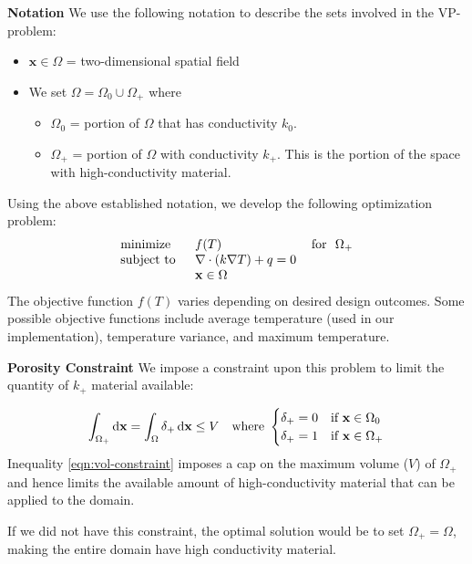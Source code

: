\documentclass[final]{beamer}
\begin{document}
\begin{frame}[t]{\textbf{Notation}}
	We use the following notation to describe the sets involved in the VP-problem:
	\begin{itemize}
		\item $\mathbf{x}\in\Omega$ = two-dimensional spatial field
		\item[] We set $\Omega = \Omega_0\cup\Omega_+$ where
		\begin{itemize}
			\item $\Omega_0$ = portion of $\Omega$ that has conductivity $k_0$.
			\item $\Omega_+$ = portion of $\Omega$ with conductivity $k_+$. This is the portion of the space with high-conductivity material.
		\end{itemize}
	\end{itemize}\vfill\pause
	Using the above established notation, we develop the following optimization problem:
	\begin{equation}
		\begin{tabular}{lll}
			\text{minimize }   & $f(T)$                                                   & \text{for } $\Omega_+$ \\
			\text{subject to } & $\nabla\cdot\left(k\nabla T\right)+q=0$  &                                      \\
			& $\mathbf{x}\in\Omega$ &                                      
		\end{tabular}\label{SIMP-Optimization-Problem}
	\end{equation}\vfill\pause
	The objective function $f(T)$ varies depending on desired design outcomes. Some possible objective functions include average temperature (used in our implementation), temperature variance, and maximum temperature.
\end{frame}

\begin{frame}{\textbf{Porosity Constraint}}
	We impose a constraint upon this problem to limit the quantity of $k_+$ material available:
	
	\begin{equation}
		\int_{\Omega_+}\dif\mathbf{x}=\int_{\Omega}\delta_+\dif\mathbf{x}\leq V\quad\text{where }\begin{cases}\delta_+ = 0 & \text{if }\mathbf{x}\in\Omega_0 \\ \delta_+ = 1 & \text{if }\mathbf{x}\in\Omega_+\end{cases}\label{eqn:vol-constraint}
	\end{equation}\vfill\pause
	Inequality \eqref{eqn:vol-constraint} imposes a cap on the maximum volume ($V$) of $\Omega_+$ and hence limits the available amount of high-conductivity material that can be applied to the domain.\vfill
	
	If we did not have this constraint, the optimal solution would be to set $\Omega_+=\Omega$, making the entire domain have high conductivity material.\vfill
\end{frame}
\end{document}
